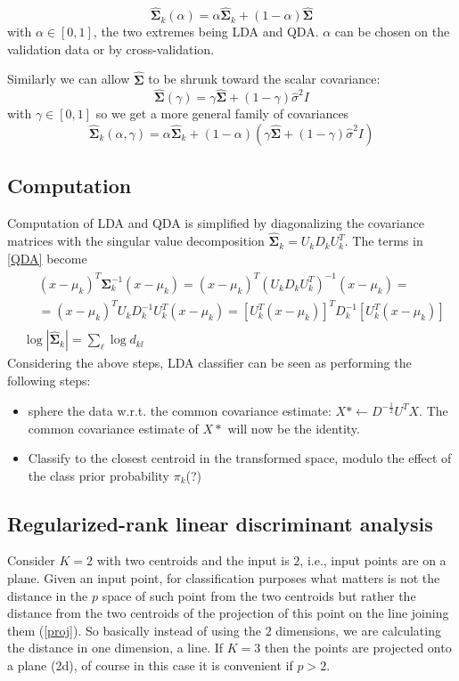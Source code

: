 \documentclass[12pt, letterpaper]{article}
\theoremstyle{definition}
\newcommand{\hS}{\mathrm{\hat{\mathbf{\Sigma}}}}
\newcommand{\si}{\mathbf{\Sigma}^{-1}}
\begin{document}
\begin{equation}
\hS_k(\alpha) = \alpha\hS_k+(1-\alpha) \hS
\end{equation}
with $\alpha \in [0,1]$, the two extremes being LDA and QDA. $\alpha$ can be chosen on the validation data or by cross-validation.

Similarly we can allow $\hS$ to be shrunk toward the scalar covariance:
\begin{equation}
\hS(\gamma) = \gamma\hS+(1-\gamma) \hat{\sigma}^2 I
\end{equation}
with $\gamma \in [0,1]$
so we get a more general family of covariances
\begin{equation}
\hS_k(\alpha, \gamma) = \alpha\hS_k+\left(1-\alpha\right) \left(\gamma\hS+\left(1-\gamma\right) \hat{\sigma}^2 I\right)
\end{equation}

\subsection{Computation}
Computation of LDA and QDA is simplified by diagonalizing the covariance matrices with the singular value decomposition $\hS_k = U_kD_kU_k^T$. The terms in \autoref{QDA} become
\begin{align}
&\begin{aligned}
&\left( x - \mu_k \right)^T \si_k\left( x - \mu_k \right)= \left( x - \mu_k \right)^T \left(U_kD_kU_k^T\right)^{-1}\left( x - \mu_k \right) =\\
&= \left( x - \mu_k \right)^T U_kD_k^{-1}U_k^T\left( x - \mu_k \right) =  \left[ U_k^T\left( x - \mu_k \right)\right]^T D_k^{-1}\left[ U_k^T\left( x - \mu_k \right)\right]
\end{aligned}\\
& \log |\hS_k| = \sum_\ell \log d_{kl}
\end{align}
Considering the above steps, LDA classifier can be seen as performing the following steps:
\begin{itemize}
\item sphere the data w.r.t. the common covariance estimate: $X*\leftarrow D^{-\frac{1}{2}} U^T X$. The common covariance estimate of $X*$ will now be the identity.
\item Classify to the closest centroid in the transformed space, modulo the effect of the class prior probability $\pi_k$(?)
\end{itemize}
\subsection{Regularized-rank linear discriminant analysis}
Consider $K=2$ with two centroids and the input is $2$, i.e., input points are on a plane. Given an input point, for classification purposes what matters is not the distance in the $p$ space of such point from the two centroids but rather the distance from the two centroids of the projection of this point on the line joining them (\autoref{proj}). So basically instead of using the $2$ dimensions, we are calculating the distance in one dimension, a line. If $K=3$ then the points are projected onto a plane (2d), of course in this case it is convenient if $p>2$.
\end{document}
